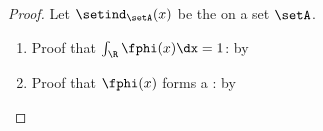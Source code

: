 \begin{proof}
Let $\setind_\setA(x)$ be the   on a set $\setA$.
\begin{enumerate}
  \item Proof that $\int_\R\fphi(x)\dx=1$:  by 
  
  \item Proof that $\fphi(x)$ forms a : by 


\end{enumerate}
\end{proof}
